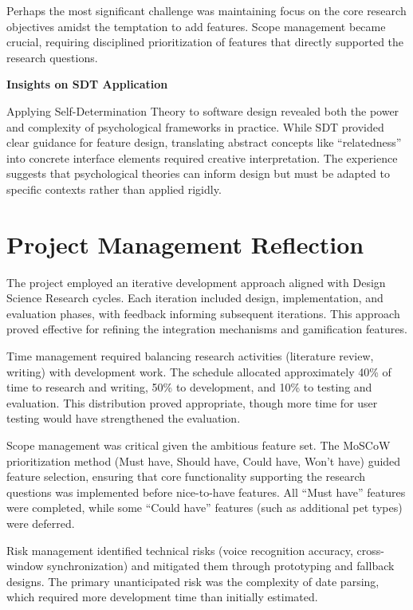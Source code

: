 Perhaps the most significant challenge was maintaining focus on the core research objectives amidst the temptation to add features. Scope management became crucial, requiring disciplined prioritization of features that directly supported the research questions.

\textbf{Insights on SDT Application}

Applying Self-Determination Theory to software design revealed both the power and complexity of psychological frameworks in practice. While SDT provided clear guidance for feature design, translating abstract concepts like ``relatedness'' into concrete interface elements required creative interpretation. The experience suggests that psychological theories can inform design but must be adapted to specific contexts rather than applied rigidly.

\section{Project Management Reflection}
\label{sec:project-management}

\completed

The project employed an iterative development approach aligned with Design Science Research cycles. Each iteration included design, implementation, and evaluation phases, with feedback informing subsequent iterations. This approach proved effective for refining the integration mechanisms and gamification features.

Time management required balancing research activities (literature review, writing) with development work. The schedule allocated approximately 40\% of time to research and writing, 50\% to development, and 10\% to testing and evaluation. This distribution proved appropriate, though more time for user testing would have strengthened the evaluation.

Scope management was critical given the ambitious feature set. The MoSCoW prioritization method (Must have, Should have, Could have, Won't have) guided feature selection, ensuring that core functionality supporting the research questions was implemented before nice-to-have features. All ``Must have'' features were completed, while some ``Could have'' features (such as additional pet types) were deferred.

Risk management identified technical risks (voice recognition accuracy, cross-window synchronization) and mitigated them through prototyping and fallback designs. The primary unanticipated risk was the complexity of date parsing, which required more development time than initially estimated.


